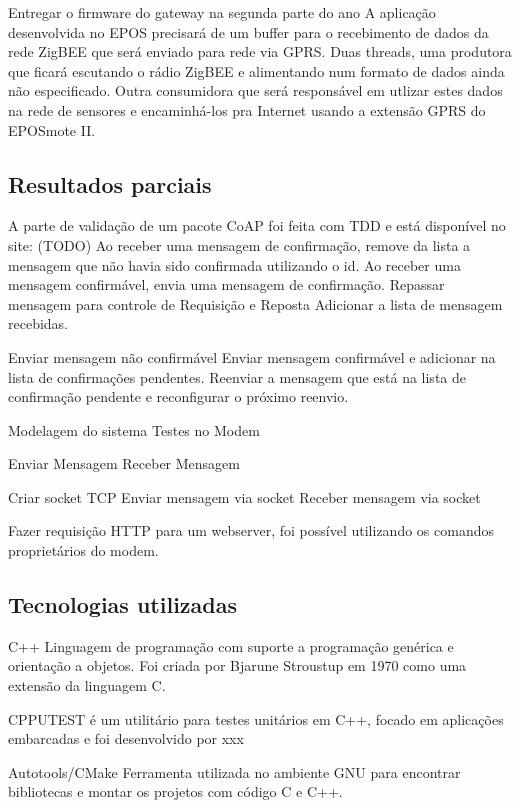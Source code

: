 Entregar o firmware do gateway na segunda parte do ano A aplica\c{c}\~ao desenvolvida no EPOS precisar\'a de um buffer para o recebimento de dados da rede ZigBEE que ser\'a enviado para rede via GPRS.
Duas threads, uma produtora que ficar\'a escutando o r\'adio ZigBEE e alimentando num formato de dados ainda n\~ao especificado. Outra consumidora que ser\'a respons\'avel em utlizar estes dados na rede de sensores e encaminh\'a-los pra Internet usando a extens\~ao GPRS do EPOSmote II.

\subsection{Resultados parciais}
A parte de valida\c{c}\~ao de um pacote CoAP foi feita com TDD e est\'a dispon\'ivel no site: (TODO)
Ao receber uma mensagem de confirma\c{c}\~ao, remove da lista a mensagem que n\~ao havia sido confirmada utilizando o id.
Ao receber uma mensagem confirm\'avel, envia uma mensagem de confirma\c{c}\~ao.
Repassar mensagem para controle de Requisi\c{c}\~ao e Reposta Adicionar a lista de mensagem recebidas.

Enviar mensagem n\~ao confirm\'avel
Enviar mensagem confirm\'avel e adicionar na lista de confirma\c{c}\~oes pendentes.
Reenviar a mensagem que est\'a na lista de confirma\c{c}\~ao pendente e reconfigurar o pr\'oximo reenvio.

Modelagem do sistema
Testes no Modem

Enviar Mensagem
Receber Mensagem

Criar socket TCP
Enviar mensagem via socket
Receber mensagem via socket

Fazer requisi\c{c}\~ao HTTP para um webserver, foi poss\'ivel utilizando os comandos propriet\'arios do modem.


\subsection{Tecnologias utilizadas}
C++
Linguagem de programa\c{c}\~ao com suporte a programa\c{c}\~ao gen\'erica e orienta\c{c}\~ao a objetos. Foi criada por Bjarune Stroustup em 1970 como uma extens\~ao da linguagem C.

CPPUTEST
\'e um utilit\'ario para testes unit\'arios em C++, focado em aplica\c{c}\~oes embarcadas e foi desenvolvido por xxx

Autotools/CMake
Ferramenta utilizada no ambiente GNU para encontrar bibliotecas e montar os projetos com c\'odigo C e C++.

